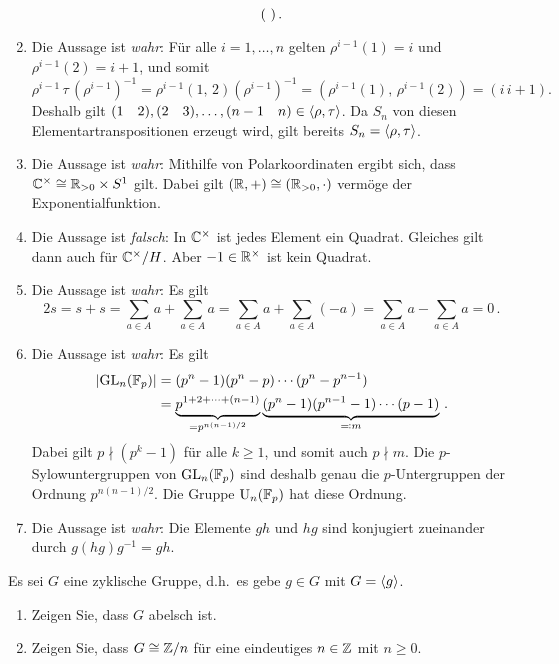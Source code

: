 \begin{solution}
\begin{enumerate}
\[\begin{psmallmatrix}
              \end{psmallmatrix} \,.
      \]
    \item
      Die Aussage ist \emph{wahr}:
      Für alle $i = 1, \dotsc, n$ gelten $\rho^{i-1}(1) = i$ und $\rho^{i-1}(2) = i+1$, und somit
      \[
        \rho^{i-1} \, \tau \, (\rho^{i-1})^{-1}
        = \rho^{i-1} (1,\, 2) (\rho^{i-1})^{-1}
        = (\rho^{i-1}(1),\, \rho^{i-1}(2))
        = (i\, i+1).
      \]
      Deshalb gilt $(1 \quad 2), (2 \quad 3), \dotsc, (n-1 \quad n) \in \langle\rho, \tau\rangle$.
      Da $S_n$ von diesen Elementartranspositionen erzeugt wird, gilt bereits $S_n = \langle\rho, \tau\rangle$.
    \item
      Die Aussage ist \emph{wahr}:
      Mithilfe von Polarkoordinaten ergibt sich, dass $\mathbb{C}^\times \cong \mathbb{R}_{> 0} \times S^1$ gilt.
      Dabei gilt $(\mathbb{R}, +) \cong (\mathbb{R}_{>0}, \cdot)$ vermöge der Exponentialfunktion.
    \item
      Die Aussage ist \emph{falsch}:
      In $\mathbb{C}^\times$ ist jedes Element ein Quadrat.
      Gleiches gilt dann auch für $\mathbb{C}^\times/H$.
      Aber $-1 \in \mathbb{R}^\times$ ist kein Quadrat.
    \item
      Die Aussage ist \emph{wahr}:
      Es gilt
      \[
          2 s
        = s + s
        = \sum_{a \in A} a + \sum_{a \in A} a
        = \sum_{a \in A} a + \sum_{a \in A} (-a)
        = \sum_{a \in A} a - \sum_{a \in A} a
        = 0 \,.
      \]
    \item
      Die Aussage ist \emph{wahr}:
      Es gilt
      \begin{align*}
            |{\operatorname{GL}_n(\mathbb{F}_p)}|
        &=  (p^n - 1)(p^n - p) \dotsm (p^n - p^{n-1}) \\
        &=  \underbrace{p^{1 + 2 + \dotsb + (n-1)}}_{= p^{n(n-1)/2}}
            \underbrace{(p^n - 1)(p^{n-1} - 1) \dotsm (p - 1)}_{\eqqcolon m} \,.
      \end{align*}
      Dabei gilt $p \nmid (p^k - 1)$ für alle $k \geq 1$, und somit auch $p \nmid m$.
      Die $p$-Sylow\-unter\-gruppen von $\operatorname{GL}_n(\mathbb{F}_p)$ sind deshalb genau die $p$-Untergruppen der Ordnung $p^{n(n-1)/2}$.
      Die Gruppe $\operatorname{U}_n(\mathbb{F}_p)$ hat diese Ordnung.
    \item
      Die Aussage ist \emph{wahr}:
      Die Elemente $gh$ und $hg$ sind konjugiert zueinander durch $g (hg) g^{-1} = gh$.
  \end{enumerate}
\end{solution}


\begin{question}[subtitle = Klassifikation zyklischer Gruppen]
  Es sei $G$ eine zyklische Gruppe, d.h.\ es gebe $g \in G$ mit $G = \langle g\rangle$.
  \begin{enumerate}
    \item
      Zeigen Sie, dass $G$ abelsch ist.
    \item
      Zeigen Sie, dass $G \cong \mathbb{Z}/n$ für eine eindeutiges $n \in \mathbb{Z}$ mit $n \geq 0$.
  \end{enumerate}
\end{question}


